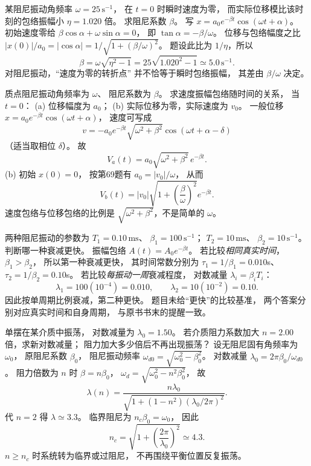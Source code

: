 某阻尼振动角频率
$\omega=25\,\mathrm{s^{-1}}$，
在 $t=0$ 时瞬时速度为零，
而实际位移模比该时刻的包络振幅小
$\eta=1.020$ 倍。
求阻尼系数 $\beta$。
\exsolution
写
$x=a_0e^{-\beta t}\cos(\omega t+\alpha)$。
初始速度零给
$\beta\cos\alpha+\omega\sin\alpha=0$，
即
$\tan\alpha=-\beta/\omega$。
位移与包络幅度之比
$|x(0)|/a_0=|\cos\alpha|
=1/\sqrt{1+(\beta/\omega)^2}$。
题设此比为 $1/\eta$，所以
\[
\boxed{\beta=\omega\sqrt{\eta^2-1}
=25\sqrt{1.020^2-1}
\simeq5.0\,\mathrm{s^{-1}}}.
\]
\excheck 对阻尼振动，“速度为零的转折点”
并不恰等于瞬时包络振幅，
其差由 $\beta/\omega$ 决定。

质点阻尼振动角频率为 $\omega$、
阻尼系数为 $\beta$。
求速度振幅包络随时间的关系，
当 $t=0$：
(a) 位移幅度为 $a_0$；
(b) 实际位移为零，实际速度为 $v_0$。
\exsolution
一般位移
$x=a_0e^{-\beta t}\cos(\omega t+\alpha)$，
速度可写成
\[
v=-a_0e^{-\beta t}\sqrt{\omega^2+\beta^2}
\cos(\omega t+\alpha-\delta)
\]
（适当取相位 $\delta$）。
故
\[
\boxed{V_a(t)=a_0\sqrt{\omega^2+\beta^2}\,
e^{-\beta t}}.
\]
(b) 初始 $x(0)=0$，
按第69题有
$a_0=|v_0|/\omega$，
从而
\[
\boxed{V_b(t)=|v_0|
\sqrt{1+\left(\frac\beta\omega\right)^2}
e^{-\beta t}}.
\]
\excheck 速度包络与位移包络的比例是
$\sqrt{\omega^2+\beta^2}$，不是简单的 $\omega$。

两种阻尼振动的参数为
$T_1=0.10\,\mathrm{ms}$、
$\beta_1=100\,\mathrm{s^{-1}}$；
$T_2=10\,\mathrm{ms}$、
$\beta_2=10\,\mathrm{s^{-1}}$。
判断哪一种衰减更快。
\exsolution
振幅包络 $A(t)=A_0e^{-\beta t}$。
若比较\emph{相同真实时间}，
$\beta_1>\beta_2$，
所以第一种衰减更快，
其时间常数分别为
$\tau_1=1/\beta_1=0.010$s、
$\tau_2=1/\beta_2=0.10$s。
若比较\emph{每振动一周}衰减程度，
对数减量
$\lambda_i=\beta_iT_i$：
\[
\boxed{\lambda_1=100(10^{-4})=0.010},
\qquad
\boxed{\lambda_2=10(10^{-2})=0.10}.
\]
因此按单周期比例衰减，第二种更快。
\excheck 题目未给“更快”的比较基准，
两个答案分别对应真实时间和自身周期，
与原书书末的提醒一致。

单摆在某介质中振荡，
对数减量为
$\lambda_0=1.50$。
若介质阻力系数加大
$n=2.00$ 倍，求新对数减量；
阻力加大多少倍后不再出现振荡？
\exsolution
设无阻尼固有角频率为
$\omega_0$，
原阻尼系数 $\beta_0$，
阻尼振动频率
$\omega_{d0}=\sqrt{\omega_0^2-\beta_0^2}$。
对数减量
$\lambda_0=2\pi\beta_0/\omega_{d0}$。
阻力倍数为 $n$ 时
$\beta=n\beta_0$，
$\omega_d=\sqrt{\omega_0^2-n^2\beta_0^2}$，
故
\[
\boxed{\lambda(n)=
\frac{n\lambda_0}
{\sqrt{1+(1-n^2)(\lambda_0/2\pi)^2}}}.
\]
代 $n=2$ 得
$\boxed{\lambda\simeq3.3}$。
临界阻尼为
$n_c\beta_0=\omega_0$，
因此
\[
\boxed{n_c=\sqrt{1+\left(\frac{2\pi}{\lambda_0}\right)^2}
\simeq4.3}.
\]
\excheck $n\ge n_c$ 时系统转为临界或过阻尼，
不再围绕平衡位置反复振荡。

